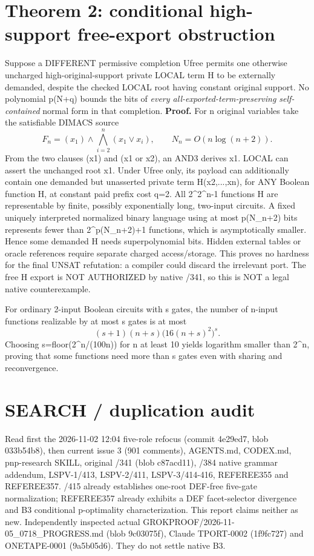 \documentclass{article}
\begin{document}
\section*{Theorem 2: conditional high-support free-export obstruction}
Suppose a DIFFERENT permissive completion Ufree permits one otherwise uncharged high-original-support private LOCAL term H to be externally demanded, despite the checked LOCAL root having constant original support. No polynomial p(N+q) bounds the bits of \emph{every all-exported-term-preserving self-contained} normal form in that completion.
\textbf{Proof.} For n original variables take the satisfiable DIMACS source
\[
 F_n=(x_1)\land\bigwedge_{i=2}^{n}(x_1\lor x_i),\qquad N_n=O(n\log(n+2)).
\]
From the two clauses (x1) and (x1 or x2), an AND3 derives x1. LOCAL can assert the unchanged root x1. Under Ufree only, its payload can additionally contain one demanded but unasserted private term H(x2,...,xn), for ANY Boolean function H, at constant paid prefix cost q=2. All 2^{2^{n-1}} functions H are representable by finite, possibly exponentially long, two-input circuits. A fixed uniquely interpreted normalized binary language using at most p(N_n+2) bits represents fewer than 2^{p(N_n+2)+1} functions, which is asymptotically smaller. Hence some demanded H needs superpolynomial bits. Hidden external tables or oracle references require separate charged access/storage. This proves no hardness for the final UNSAT refutation: a compiler could discard the irrelevant port. The free H export is NOT AUTHORIZED by native /341, so this is NOT a legal native counterexample.

For ordinary 2-input Boolean circuits with s gates, the number of n-input functions realizable by at most s gates is at most
\[
(s+1)(n+s)\bigl(16(n+s)^2\bigr)^s.
\]
Choosing s=floor(2^n/(100n)) for n at least 10 yields logarithm smaller than 2^n, proving that some functions need more than s gates even with sharing and reconvergence.

\section*{SEARCH / duplication audit}
Read first the 2026-11-02 12:04 five-role refocus (commit 4e29ed7, blob 033b54b8), then current issue 3 (901 comments), AGENTS.md, CODEX.md, pnp-research SKILL, original /341 (blob c87acd11), /384 native grammar addendum, LSPV-1/413, LSPV-2/411, LSPV-3/414-416, REFEREE355 and REFEREE357. /415 already establishes one-root DEF-free five-gate normalization; REFEREE357 already exhibits a DEF facet-selector divergence and B3 conditional p-optimality characterization. This report claims neither as new. Independently inspected actual GROKPROOF/2026-11-05_0718_PROGRESS.md (blob 9c03075f), Claude TPORT-0002 (1f9fc727) and ONETAPE-0001 (9a5b05d6). They do not settle native B3.
\end{document}
